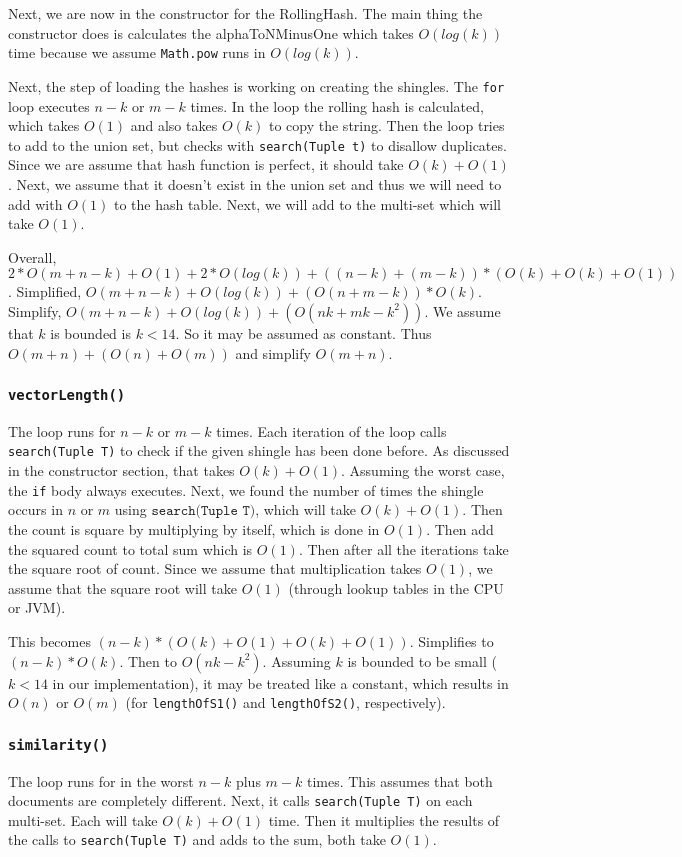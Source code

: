 \documentclass[10pt,letterpaper]{article}
\begin{document}
Next, we are now in the constructor for the RollingHash. The main thing the constructor does is
calculates the alphaToNMinusOne which takes $O(log(k))$ time because we assume \texttt{Math.pow} runs in $O(log(k))$.

Next, the step of loading the hashes is working on creating the shingles. The \texttt{for} loop executes $n-k$ or $m-k$ times. In the loop the rolling hash is calculated, which takes $O(1)$ and also takes $O(k)$ to copy the string. Then the loop tries to add to the union set, but checks with \texttt{search(Tuple t)} to disallow duplicates. Since we are assume that hash function is perfect, it should take $O(k) + O(1)$. Next, we assume that it doesn't exist in the union set and thus we will need to add with $O(1)$ to the hash table. Next, we will add to the multi-set which will take $O(1)$. 

Overall, $2*O(m+n-k)+O(1)+2*O(log(k))+((n-k)+(m-k))*(O(k)+O(k)+O(1))$. 
Simplified, $O(m+n-k)+O(log(k))+(O(n+m-k))*O(k)$. 
Simplify, $O(m+n-k)+O(log(k))+(O(nk+mk-k^2))$. We assume that $k$ is bounded is $k<14$. So it may be assumed as constant.
Thus $O(m+n)+(O(n)+O(m))$ and simplify $O(m+n)$.
\subsubsection{\texttt{vectorLength()}}
The loop runs for $n-k$ or $m-k$ times. Each iteration of the loop calls \texttt{search(Tuple T)} to check if the given shingle has been done before. As discussed in the constructor section, that takes $O(k) + O(1)$. Assuming the worst case, the \texttt{if} body always executes. Next, we found the number of times the shingle occurs in $n$ or $m$ using $ \texttt{search(Tuple T)}$, which will take $O(k) + O(1)$. Then the count is square by multiplying by itself, which is done in $O(1)$. Then add the squared count to total sum which is $O(1)$. Then after all the iterations take the square root of count. Since we assume that multiplication takes $O(1)$, we assume that the square root will take $O(1)$ (through lookup tables in the CPU or JVM).

This becomes $(n-k)*(O(k)+O(1)+O(k)+O(1))$. Simplifies to $(n-k)*O(k)$. Then to $O(nk-k^2)$. Assuming $k$ is bounded to be small ($k<14$ in our implementation), it may be treated like a constant, which results in $O(n)$ or $O(m)$ (for \texttt{lengthOfS1()} and \texttt{lengthOfS2()}, respectively).
\subsubsection{\texttt{similarity()}}
The loop runs for in the worst $n-k$ plus $m-k$ times. This assumes that both documents are completely different. Next, it calls \texttt{search(Tuple T)} on each multi-set. Each will take $O(k) + O(1)$ time. Then it multiplies the results of the calls to \texttt{search(Tuple T)} and adds to the sum, both take $O(1)$.
\end{document}

